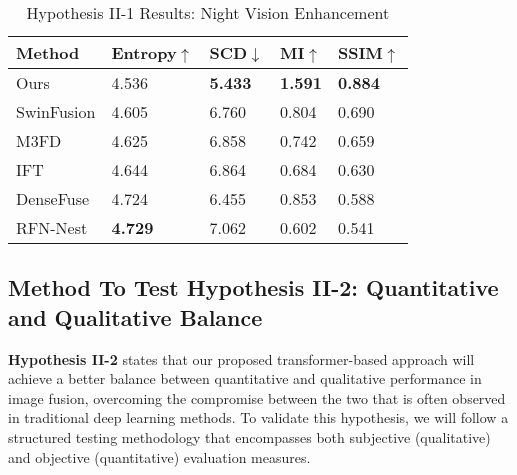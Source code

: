 \begin{table}[htbp]
    \centering
    \caption{Hypothesis II-1 Results: Night Vision Enhancement}
    \label{tab:ch5:met4}
    \begin{tabular}{|l|l|l|l|l|}
        \hline
        \textbf{Method} & \textbf{Entropy\cite{roberts2008assessment}$\uparrow$ } & \textbf{SCD\cite{aslantas2015new}$\downarrow$} & \textbf{MI\cite{qu2002information}$\uparrow$} & \textbf{SSIM\cite{ma2015perceptual}$\uparrow$} \\ \hline
        Ours            & 4.536                & \textbf{5.433}       & \textbf{1.591}           &\textbf{0.884}             \\ \hline
        SwinFusion\cite{ma2022swinfusion}           & 4.605                & 6.760       & 0.804           & 0.690             \\ \hline
        M3FD\cite{liu2022target}           & 4.625                & 6.858       & 0.742           & 0.659             \\ \hline
        IFT\cite{vs2022image}           & 4.644                & 6.864       & 0.684           & 0.630             \\ \hline
        DenseFuse\cite{li2019infrared}           & 4.724                & 6.455       & 0.853           & 0.588             \\ \hline
        RFN-Nest\cite{li2021rfn}            & \textbf{4.729}                & 7.062       & 0.602           & 0.541             \\ \hline
    \end{tabular}
\end{table}

\subsection{Method To Test Hypothesis II-2: Quantitative and Qualitative Balance} \label{subsec:met5}

\textbf{Hypothesis II-2} states that our proposed transformer-based approach will achieve a better balance between quantitative and qualitative performance in image fusion, overcoming the compromise between the two that is often observed in traditional deep learning methods. To validate this hypothesis, we will follow a structured testing methodology that encompasses both subjective (qualitative) and objective (quantitative) evaluation measures.

